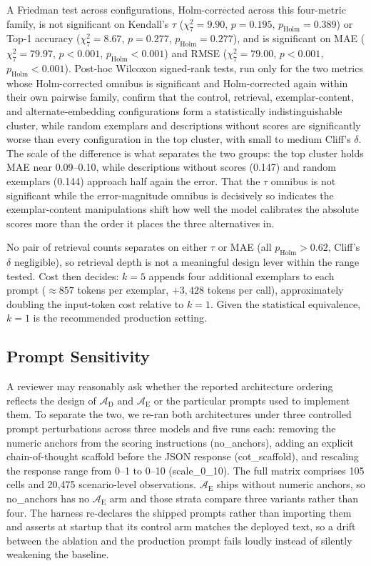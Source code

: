 \documentclass[final,3p,times]{elsarticle}
\begin{document}
A Friedman test across configurations, Holm-corrected across this four-metric family, is not significant on Kendall's $\tau$ ($\chi^2_7 = 9.90$, $p = 0.195$, $p_{\text{Holm}} = 0.389$) or Top-1 accuracy ($\chi^2_7 = 8.67$, $p = 0.277$, $p_{\text{Holm}} = 0.277$), and is significant on MAE ($\chi^2_7 = 79.97$, $p < 0.001$, $p_{\text{Holm}} < 0.001$) and RMSE ($\chi^2_7 = 79.00$, $p < 0.001$, $p_{\text{Holm}} < 0.001$). Post-hoc Wilcoxon signed-rank tests, run only for the two metrics whose Holm-corrected omnibus is significant and Holm-corrected again within their own pairwise family, confirm that the control, retrieval, exemplar-content, and alternate-embedding configurations form a statistically indistinguishable cluster, while random exemplars and descriptions without scores are significantly worse than every configuration in the top cluster, with small to medium Cliff's $\delta$. The scale of the difference is what separates the two groups: the top cluster holds MAE near 0.09--0.10, while descriptions without scores (0.147) and random exemplars (0.144) approach half again the error. That the $\tau$ omnibus is not significant while the error-magnitude omnibus is decisively so indicates the exemplar-content manipulations shift how well the model calibrates the absolute scores more than the order it places the three alternatives in. 

No pair of retrieval counts separates on either $\tau$ or MAE (all $p_{\text{Holm}} > 0.62$, Cliff's $\delta$ negligible), so retrieval depth is not a meaningful design lever within the range tested. Cost then decides: $k=5$ appends four additional exemplars to each prompt (${\approx}857$ tokens per exemplar, $+3{,}428$ tokens per call), approximately doubling the input-token cost relative to $k=1$. Given the statistical equivalence, $k=1$ is the recommended production setting.

\FloatBarrier
\subsection{Prompt Sensitivity}
\label{sec:prompt-ablation}

A reviewer may reasonably ask whether the reported architecture ordering reflects the design of $\mathcal{A}_{\text{D}}$ and $\mathcal{A}_{\text{E}}$ or the particular prompts used to implement them. To separate the two, we re-ran both architectures under three controlled prompt perturbations across three models and five runs each: removing the numeric anchors from the scoring instructions (no\_anchors), adding an explicit chain-of-thought scaffold before the JSON response (cot\_scaffold), and rescaling the response range from 0--1 to 0--10 (scale\_0\_10). The full matrix comprises 105 cells and 20{,}475 scenario-level observations. $\mathcal{A}_{\text{E}}$ ships without numeric anchors, so no\_anchors has no $\mathcal{A}_{\text{E}}$ arm and those strata compare three variants rather than four. The harness re-declares the shipped prompts rather than importing them and asserts at startup that its control arm matches the deployed text, so a drift between the ablation and the production prompt fails loudly instead of silently weakening the baseline.
\end{document}
